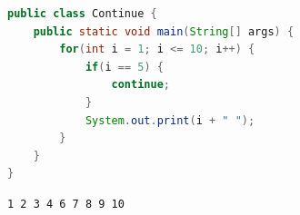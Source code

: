 \vspace{0.5cm}


\begin{lstlisting}[language=Java]
public class Continue {
    public static void main(String[] args) {
        for(int i = 1; i <= 10; i++) {
            if(i == 5) {
                continue;
            }
            System.out.print(i + " ");
        }
    }
}
\end{lstlisting}

\begin{tcolorbox}
	\begin{verbatim}
1 2 3 4 6 7 8 9 10
    \end{verbatim}
\end{tcolorbox}

\newpage